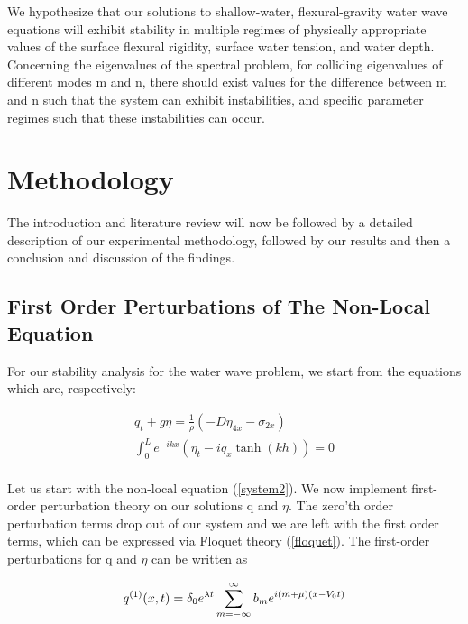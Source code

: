 \documentclass{article}
\begin{document}
We hypothesize that our solutions to shallow-water, flexural-gravity water wave equations will exhibit stability in multiple regimes of physically appropriate values of the surface flexural rigidity, surface water tension, and water depth. Concerning the eigenvalues of the spectral problem, for colliding eigenvalues of different modes m and n, there should exist values for the difference between m and n such that the system can exhibit instabilities, and specific parameter regimes such that these instabilities can occur. 
\\

\section{Methodology}

The introduction and literature review will now be followed by a detailed description of our experimental methodology, followed by our results and then a conclusion and discussion of the findings. 
 \\
 
\subsection{First Order Perturbations of The Non-Local Equation}

For our stability analysis for the water wave problem, we start from the equations which are, respectively:

\begin{align} \label{system}
q_{t} + g\eta = \frac{1}{\rho}( -D\eta_{4x} - \sigma_{2x} )\\\label{system2}
\int_{0}^{L} e^{-ikx}(\eta_{t} - iq_{x}\tanh(kh)) = 0
\end{align}
\\

Let us start with the non-local equation (\ref{system2}). We now implement first-order perturbation theory on our solutions q and \(\eta\). The zero'th order perturbation terms drop out of our system and we are left with the first order terms, which can be expressed via Floquet theory (\ref{floquet}). The first-order perturbations for q and \(\eta\) can be written as

\begin{equation} \label{q}
  q^{(1)}(x,t) = \delta_{0}e^{\lambda t}\sum_{m=-\infty}^{\infty}b_{m}e^{i(m+\mu)(x-V_{0}t)}
\\
\end{equation}
\end{document}
